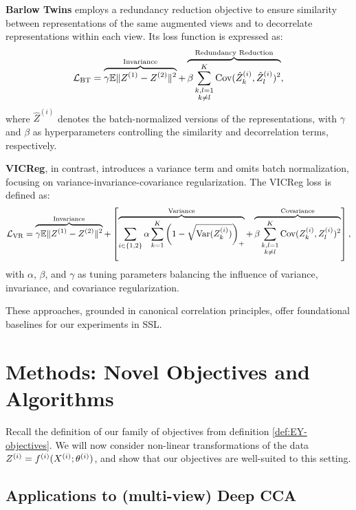\textbf{Barlow Twins} employs a redundancy reduction objective to ensure similarity between representations of the same augmented views and to decorrelate representations within each view.
Its loss function is expressed as:
\begin{align}
    \mathcal{L}_\text{BT} = \overbrace{\gamma \mathbb{E} \lVert Z^{(1)} - Z^{(2)}\rVert^2}^{\text{Invariance}} + \overbrace{\beta \sum_{\substack{k,l=1 \\ k \neq l}}^K \mathrm{Cov}(\hat{Z}^{(i)}_k, \hat{Z}^{(i)}_l)^2}^{\text{Redundancy Reduction}},
\end{align}
where \( \hat{Z}^{(i)} \) denotes the batch-normalized versions of the representations, with \( \gamma \) and \( \beta \) as hyperparameters controlling the similarity and decorrelation terms, respectively.

\textbf{VICReg}, in contrast, introduces a variance term and omits batch normalization, focusing on variance-invariance-covariance regularization.
The VICReg loss is defined as:
\begin{align}
    \mathcal{L}_\text{VR} = \overbrace{\gamma \mathbb{E} \lVert Z^{(1)} - Z^{(2)}\rVert^2}^{\text{Invariance}} + \left[\overbrace{\sum_{i \in \{1,2\}} \alpha \sum_{k=1}^K \left(1 - \sqrt{\mathrm{Var}(Z^{(i)}_k)}\right)_+}^{\text{Variance}} + \overbrace{\beta \sum_{\substack{k,l=1 \\ k \neq l}}^K \mathrm{Cov}(Z^{(i)}_k, Z^{(i)}_l)^2 }^{\text{Covariance}}\right],
\end{align}
with \( \alpha \), \( \beta \), and \( \gamma \) as tuning parameters balancing the influence of variance, invariance, and covariance regularization.

These approaches, grounded in canonical correlation principles, offer foundational baselines for our experiments in SSL.


\section{Methods: Novel Objectives and Algorithms}

Recall the definition of our family of objectives from definition \ref{def:EY-objectives}.
We will now consider non-linear transformations of the data $Z^{(i)} = f^{(i)}( X^{(i)}; \theta^{(i)})$, and show that our objectives are well-suited to this setting.

\subsection{Applications to (multi-view) Deep CCA}

